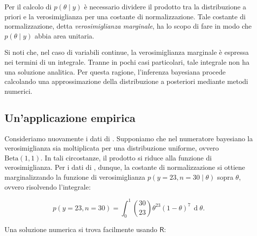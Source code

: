 \documentclass[
  11pt,
]{krantz}
\makeatletter
\newenvironment{Shaded}{\begin{snugshade}}{\end{snugshade}}
\newcommand{\AttributeTok}[1]{\textcolor[rgb]{0.61,0.61,0.61}{#1}}
\newcommand{\CommentTok}[1]{\textcolor[rgb]{0.37,0.37,0.37}{\textit{#1}}}
\newcommand{\ControlFlowTok}[1]{\textcolor[rgb]{0.27,0.27,0.27}{\textbf{#1}}}
\newcommand{\DecValTok}[1]{\textcolor[rgb]{0.06,0.06,0.06}{#1}}
\newcommand{\FunctionTok}[1]{\textcolor[rgb]{0,0,0}{#1}}
\newcommand{\NormalTok}[1]{#1}
\newcommand{\OtherTok}[1]{\textcolor[rgb]{0.37,0.37,0.37}{#1}}
\newcommand{\SpecialCharTok}[1]{\textcolor[rgb]{0,0,0}{#1}}
\newenvironment{kframe}{%
\medskip{}
\setlength{\fboxsep}{.8em}
 \def\at@end@of@kframe{}%
 \ifinner\ifhmode%
  \def\at@end@of@kframe{\end{minipage}}%
  \begin{minipage}{\columnwidth}%
 \fi\fi%
 \def\FrameCommand##1{\hskip\@totalleftmargin \hskip-\fboxsep
 \colorbox{shadecolor}{##1}\hskip-\fboxsep
     \hskip-\linewidth \hskip-\@totalleftmargin \hskip\columnwidth}%
 \MakeFramed {\advance\hsize-\width
   \@totalleftmargin\z@ \linewidth\hsize
   \@setminipage}}%
 {\par\unskip\endMakeFramed%
 \at@end@of@kframe}
\renewenvironment{Shaded}{\begin{kframe}}{\end{kframe}}
\newcommand{\R}{\textsf{R}} %
\theoremstyle{definition}
\theoremstyle{definition}
\theoremstyle{definition}
\theoremstyle{definition}
\theoremstyle{remark}
\makeatother
\begin{document}
Per il calcolo di \(p(\theta \mid y)\) è necessario dividere il prodotto tra la distribuzione a priori e la verosimiglianza per una costante di normalizzazione. Tale costante di normalizzazione, detta \emph{verosimiglianza marginale}, ha lo scopo di fare in modo che \(p(\theta \mid y)\) abbia area unitaria.

Si noti che, nel caso di variabili continue, la verosimiglianza marginale è espressa nei termini di un integrale. Tranne in pochi casi particolari, tale integrale non ha una soluzione analitica. Per questa ragione, l'inferenza bayesiana procede calcolando una approssimazione della distribuzione a posteriori mediante metodi numerici.

\hypertarget{unapplicazione-empirica-2}{%
\subsection{Un'applicazione empirica}\label{unapplicazione-empirica-2}}

Consideriamo nuovamente i dati di \citet{zetschefuture2019}. Supponiamo che nel numeratore bayesiano la verosimiglianza sia moltiplicata per una distribuzione uniforme, ovvero \(\mbox{Beta}(1, 1)\). In tali circostanze, il prodotto si riduce alla funzione di verosimiglianza. Per i dati di \citet{zetschefuture2019}, dunque, la costante di normalizzazione si ottiene marginalizzando la funzione di verosimiglianza \(p(y = 23, n = 30 \mid \theta)\) sopra \(\theta\), ovvero risolvendo l'integrale:

\begin{equation}
p(y = 23, n = 30) = \int_0^1 \binom{30}{23} \theta^{23} (1-\theta)^{7} \,\operatorname {d}\!\theta.
\label{eq:intlikebino23}
\end{equation}

Una soluzione numerica si trova facilmente usando \(\R\):

\begin{Shaded}
\end{Shaded}
\end{document}
